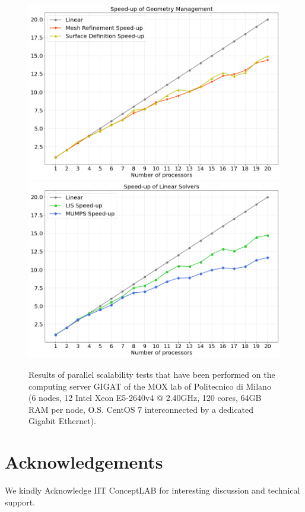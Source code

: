 \documentclass[11pt,a4paper,twocolumn]{article}
\begin{document}
\begin{figure}[h]
    \centering
    \includegraphics[width=.45\linewidth]{Images/geometry_speedup} \qquad
    \includegraphics[width=.45\linewidth]{Images/linsolv_speedup}
    \caption{Results of parallel scalability tests that 
    have been performed on the computing server GIGAT of the MOX lab of Politecnico di Milano (6 nodes, 12 Intel Xeon E5-2640v4 @ 2.40GHz, 120 cores, 64GB RAM per node, O.S. CentOS 7
interconnected by a dedicated Gigabit Ethernet).}
    \label{fig:scaling}
\end{figure}

\section{Acknowledgements}
We kindly Acknowledge IIT ConceptLAB for interesting discussion and technical support.

\nocite{*}
\end{document}
